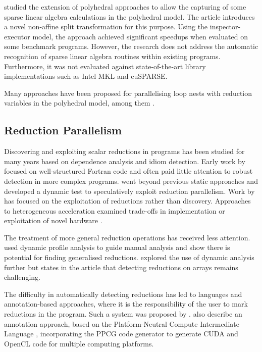     \citet{Zhang:2016:CTG:3018843.3018849} studied the extension of polyhedral
    approaches to allow the capturing of some sparse linear algebra
    calculations in the polyhedral model.
    The article introduces a novel non-affine split transformation for this
    purpose.
    Using the inspector-executor model, the approach achieved significant
    speedups when evaluated on some benchmark programs.
    However, the research does not address the automatic recognition of sparse
    linear algebra routines within existing programs.
    Furthermore, it was not evaluated against state-of-the-art
    library implementations such as Intel MKL and cuSPARSE.

    Many approaches have been proposed for parallelising loop nests with
    reduction variables in the polyhedral model, among them
    \citet{jouvelot1989unified,redon1994scheduling,chi1997optimizing,
    gupta2006simplifying,stock2014framework}.

\subsection{Reduction Parallelism}

    Discovering and exploiting scalar reductions in programs has been studied
    for many years based on dependence analysis and idiom detection.
    Early work by
    \citet{pottenger1995idiom,suganuma1996detection,fisher1994parallelizing}
    focused on well-structured Fortran code and often paid little attention to
    robust detection in more complex programs.
    \citet{rauchwerger1999lrpd} went beyond previous static approaches and
    developed a dynamic test to speculatively exploit reduction parallelism.
    Work by
    \citet{Gutierrez:2000,gutierrez2003optimization,gutierrez2008analytical}
    has focused on the exploitation of reductions rather than discovery.
    Approaches to heterogeneous acceleration examined trade-offs in
    implementation \citep{yu2006adaptive} or exploitation of novel hardware
    \citep{ravi2010compiler,Huo2011HiPC}.

    The treatment of more general reduction operations has received less
    attention.
    \citet{das2010experiences} used dynamic profile analysis to guide
    manual analysis and show there is potential for finding generalised
    reductions.
    \citet{kim2012dynamic} explored the use of dynamic analysis further
    but states in the article that detecting reductions on arrays remains
    challenging.

    The difficulty in automatically detecting reductions has led to languages
    and annotation-based approaches, where it is the responsibility of the user
    to mark reductions in the program.
    Such a system was proposed by \citet{deitz2002high}.
    \citet{Reddy2016Reduction} also describe an annotation approach,
    based on the Platform-Neutral Compute Intermediate Language
    \citep{baghdadi2015PENCIL}, incorporating the PPCG code generator to
    generate CUDA and OpenCL code for multiple computing platforms.

